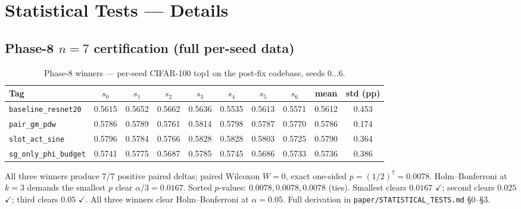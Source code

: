 \documentclass{article}
\begin{document}



\onecolumn
\appendix

\section{Statistical Tests --- Details}
\label{app:stats}

\subsection{Phase-8 $n{=}7$ certification (full per-seed data)}
\label{app:phase-8-seeds}

\begin{table}[h!]
\small\centering
\caption{Phase-8 winners --- per-seed CIFAR-100 top1 on the post-fix
codebase, seeds $0\ldots 6$.}
\begin{tabular}{l ccccccc c c}
\toprule
Tag & $s_0$ & $s_1$ & $s_2$ & $s_3$ & $s_4$ & $s_5$ & $s_6$ & mean & std (pp) \\
\midrule
\texttt{baseline\_resnet20}      & 0.5615 & 0.5652 & 0.5662 & 0.5636 & 0.5535 & 0.5613 & 0.5571 & 0.5612 & 0.453 \\
\texttt{pair\_gm\_pdw}           & 0.5786 & 0.5789 & 0.5761 & 0.5814 & 0.5798 & 0.5787 & 0.5770 & 0.5786 & 0.174 \\
\texttt{slot\_act\_sine}         & 0.5796 & 0.5784 & 0.5766 & 0.5828 & 0.5828 & 0.5803 & 0.5725 & 0.5790 & 0.364 \\
\texttt{sg\_only\_phi\_budget}   & 0.5741 & 0.5775 & 0.5687 & 0.5785 & 0.5745 & 0.5686 & 0.5733 & 0.5736 & 0.386 \\
\bottomrule
\end{tabular}
\end{table}

All three winners produce 7/7 positive paired deltas; paired Wilcoxon
$W{=}0$, exact one-sided $p=(1/2)^7=0.0078$. Holm--Bonferroni at
$k{=}3$ demands the smallest $p$ clear $\alpha/3=0.0167$. Sorted
$p$-values: $0.0078, 0.0078, 0.0078$ (ties). Smallest clears $0.0167$
$\checkmark$; second clears $0.025$ $\checkmark$; third clears $0.05$
$\checkmark$. All three winners clear Holm--Bonferroni at
$\alpha{=}0.05$. Full derivation in
\texttt{paper/STATISTICAL\_TESTS.md} \S0--\S3.
\end{document}
